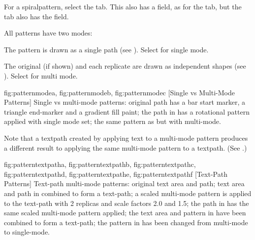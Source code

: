 
For a \gls{spiralpattern}, select the  tab.
This also has a  field, as for the
 tab, but the  tab
also has the  field.


All patterns have two modes:
\begin{deflist}
\begin{itemdesc}
The pattern is drawn as a single path (see ).
Select  for single mode.
\end{itemdesc}

\begin{itemdesc}
The original (if shown) and each replicate are drawn as 
independent shapes (see ).
Select  for multi mode.
\end{itemdesc}

\end{deflist}

{
  {fig:patternmodea}{}{},
  {fig:patternmodeb}{}{},
  {fig:patternmodec}{}{}
}
[Single vs Multi-Mode Patterns]
{Single vs multi-mode patterns:
 original path
has a bar start marker, a triangle end-marker and a gradient fill paint;
 the path in  has
a rotational pattern applied with single mode set;
 the same pattern 
as  but with multi-mode.}

Note that a \gls{textpath} created by applying text to a multi-mode
pattern produces a different result to applying the same multi-mode
pattern to a \gls{textpath}. (See .)

{
  {fig:patterntextpatha}{}{},
  {fig:patterntextpathb}{}{},
  {fig:patterntextpathc}{}{},
  {fig:patterntextpathd}{}{},
  {fig:patterntextpathe}{}{},
  {fig:patterntextpathf}{}{}
}
[Text-Path Patterns]
{Text-path multi-mode patterns:
 original text area and path;
 text area and path in
 combined to form a text-path;
 a scaled
multi-mode pattern is applied to the text-path with 2 replicas and scale
factors 2.0 and 1.5;
 the path in  has
the same scaled multi-mode pattern applied;
 the text area and
pattern in  have been combined to form a
text-path;
 the pattern in  has
been changed from multi-mode to single-mode.}


